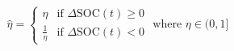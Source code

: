 \begin{equation}
\hat{\eta} =
	\begin{cases}
		\eta &\text{if } \Delta\text{SOC}(t) \geq 0 \\
		\frac{1}{\eta} &\text{if } \Delta\text{SOC}(t) < 0
	\end{cases}
	\text{ where } \eta \in (0, 1]
\label{ch4:equ:energy-conversion-adjustment}
\end{equation}
